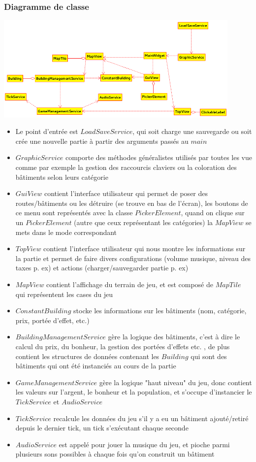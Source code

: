 \documentclass[a4paper,10pt,openany,oneside]{report}
\begin{document}
\subsubsection{Diagramme de classe}
\includegraphics[width=0.9\textwidth]{img/hierarchieClasses.png}
\begin{itemize}
\item Le point d'entrée est $LoadSaveService$, qui soit charge une sauvegarde ou soit crée une nouvelle partie à partir des arguments passés au $main$
\item $GraphicService$ comporte des méthodes généralistes utilisés par toutes les vue comme par exemple la gestion des raccourcis claviers ou la coloration des bâtiments selon leurs catégorie
\item $GuiView$ contient l'interface utilisateur qui permet de poser des routes/bâtiments ou les détruire (se trouve en bas de l'écran), les boutons de ce menu sont représentés avec la classe $PickerElement$, quand on clique sur un $PickerElement$ (autre que ceux représentant les catégories) la $MapView$ se mets dans le mode correspondant
\item $TopView$ contient l'interface utilisateur qui nous montre les informations sur la partie et permet de faire divers configurations (volume musique, niveau des taxes p. ex) et actions  (charger/sauvegarder partie p. ex)
\item $MapView$ contient l'affichage du terrain de jeu, et est composé de $MapTile$ qui représentent les cases du jeu
\item $ConstantBuilding$ stocke les informations sur les bâtiments (nom, catégorie, prix, portée d'effet, etc.)
\item $BuildingManagementService$ gère la logique des bâtiments, c'est à dire le calcul du prix, du bonheur, la gestion des portées d'effets etc. , de plus contient les structures de données contenant les $Building$ qui sont des bâtiments qui ont été instanciés au cours de la partie
\item $GameManagementService$ gère la logique "haut niveau" du jeu, donc contient les valeurs sur l'argent, le bonheur et la population, et s'occupe d'instancier le $TickService$ et $AudioService$
\item $TickService$ recalcule les données du jeu s'il y a eu un bâtiment ajouté/retiré depuis le dernier tick, un tick s’exécutant chaque seconde
\item $AudioService$ est appelé pour jouer la musique du jeu, et pioche parmi plusieurs sons possibles à chaque fois qu'on construit un bâtiment
\end{itemize}
\end{document}
